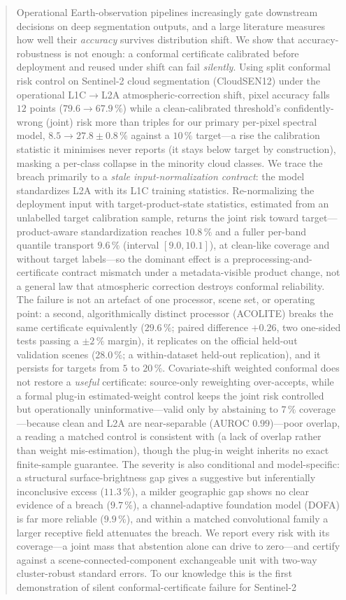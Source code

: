 \documentclass[preprint,3p,times]{elsarticle}
\begin{document}
\begin{frontmatter}
\begin{abstract}
Operational Earth-observation pipelines increasingly gate downstream decisions on deep segmentation outputs, and a large literature measures how well their \emph{accuracy} survives distribution shift. We show that accuracy-robustness is not enough: a conformal certificate calibrated before deployment and reused under shift can fail \emph{silently}. Using split conformal risk control on Sentinel-2 cloud segmentation (CloudSEN12) under the operational L1C$\to$L2A atmospheric-correction shift, pixel accuracy falls $12$ points ($79.6 \to 67.9\,\%$) while a clean-calibrated threshold's confidently-wrong (joint) risk more than triples for our primary per-pixel spectral model, $8.5 \to 27.8 \pm 0.8\,\%$ against a $10\,\%$ target---a rise the calibration statistic it minimises never reports (it stays below target by construction), masking a per-class collapse in the minority cloud classes. We trace the breach primarily to a \emph{stale input-normalization contract}: the model standardizes L2A with its L1C training statistics. Re-normalizing the deployment input with target-product-state statistics, estimated from an unlabelled target calibration sample, returns the joint risk toward target---product-aware standardization reaches $10.8\,\%$ and a fuller per-band quantile transport $9.6\,\%$ (interval $[9.0,10.1]$), at clean-like coverage and without target labels---so the dominant effect is a preprocessing-and-certificate contract mismatch under a metadata-visible product change, not a general law that atmospheric correction destroys conformal reliability. The failure is not an artefact of one processor, scene set, or operating point: a second, algorithmically distinct processor (ACOLITE) breaks the same certificate equivalently ($29.6\,\%$; paired difference $+0.26$, two one-sided tests passing a $\pm2\,\%$ margin), it replicates on the official held-out validation scenes ($28.0\,\%$; a within-dataset held-out replication), and it persists for targets from $5$ to $20\,\%$. Covariate-shift weighted conformal does not restore a \emph{useful} certificate: source-only reweighting over-accepts, while a formal plug-in estimated-weight control keeps the joint risk controlled but operationally uninformative---valid only by abstaining to $7\,\%$ coverage---because clean and L2A are near-separable (AUROC $0.99$)---poor overlap, a reading a matched control is consistent with (a lack of overlap rather than weight mis-estimation), though the plug-in weight inherits no exact finite-sample guarantee. The severity is also conditional and model-specific: a structural surface-brightness gap gives a suggestive but inferentially inconclusive excess ($11.3\,\%$), a milder geographic gap shows no clear evidence of a breach ($9.7\,\%$), a channel-adaptive foundation model (DOFA) is far more reliable ($9.9\,\%$), and within a matched convolutional family a larger receptive field attenuates the breach. We report every risk with its coverage---a joint mass that abstention alone can drive to zero---and certify against a scene-connected-component exchangeable unit with two-way cluster-robust standard errors. To our knowledge this is the first demonstration of silent conformal-certificate failure for Sentinel-2 
\end{abstract}
\end{frontmatter}
\end{document}
